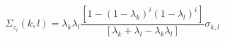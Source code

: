 

\[
\Sigma_{z_{i}}(k,l) = \lambda_{k}\lambda_{l}\frac{[1 - (1 - \lambda_k)^i(1 - \lambda_l)^i]}{[\lambda_k + \lambda_l - \lambda_k\lambda_l]}\sigma_{k,l}
\]


